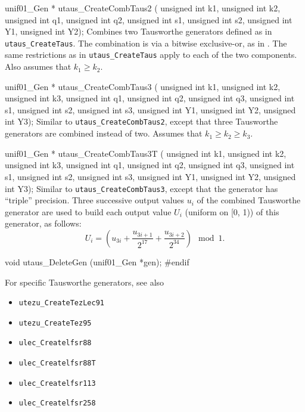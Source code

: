 unif01_Gen * utaus_CreateCombTaus2 (
   unsigned int k1, unsigned int k2, unsigned int q1, unsigned int q2,
   unsigned int s1, unsigned int s2, unsigned int Y1, unsigned int Y2);
\endcode
  \tab  Combines two Tausworthe generators defined as in 
   {\tt utaus\_CreateTaus}. The combination is via a bitwise exclusive-or,
   as in \cite{rLEC96a,rTEZ89a,rTEZ91b}.
   The same restrictions as in  {\tt utaus\_CreateTaus} apply to each of the
   two components.
   Also assumes that $k_1\ge k_2$.
  \endtab
\code


unif01_Gen * utaus_CreateCombTaus3 (
    unsigned int k1, unsigned int k2, unsigned int k3,
    unsigned int q1, unsigned int q2, unsigned int q3,
    unsigned int s1, unsigned int s2, unsigned int s3,
    unsigned int Y1, unsigned int Y2, unsigned int Y3);
\endcode
  \tab  Similar to {\tt utaus\_CreateCombTaus2}, except that 
   three Tausworthe generators are combined instead of two.
   Assumes that  $k_1 \ge k_2 \ge k_3$.
  \endtab
\code


unif01_Gen * utaus_CreateCombTaus3T (
    unsigned int k1, unsigned int k2, unsigned int k3,
    unsigned int q1, unsigned int q2, unsigned int q3,
    unsigned int s1, unsigned int s2, unsigned int s3,
    unsigned int Y1, unsigned int Y2, unsigned int Y3);
\endcode
  \tab  Similar to  {\tt utaus\_CreateCombTaus3}, except that the
   generator has ``triple'' precision.   Three successive output values 
   $u_i$ of the combined Tausworthe generator are used to build each 
   output value $U_i$ (uniform on [0, 1)) of this generator, as follows:
  $$
   U_{i} = \left(u_{3i} + \frac{u_{3i+1}}{2^{17}}  + 
           \frac{u_{3i+2}}{2^{34}}\right) \mod 1.
  $$
  \endtab



\code

void utaus_DeleteGen (unif01_Gen *gen);
\endcode
 \tab \DelGen
 \endtab
\code
\hide
#endif
\endhide
\endcode




For specific Tausworthe generators, see also
{
\setlength{\partopsep}{0pt}
\setlength{\parskip}{0pt}
\setlength{\topsep}{0pt}
\setlength{\itemsep}{0pt}

\begin{itemize}
\item {\tt utezu\_CreateTezLec91}
\item {\tt utezu\_CreateTez95}
\end{itemize}

\bigskip
\begin{itemize}
\item {\tt ulec\_Createlfsr88}
\item {\tt ulec\_Createlfsr88T}
\item {\tt ulec\_Createlfsr113}
\item {\tt ulec\_Createlfsr258}
\end{itemize}
}
